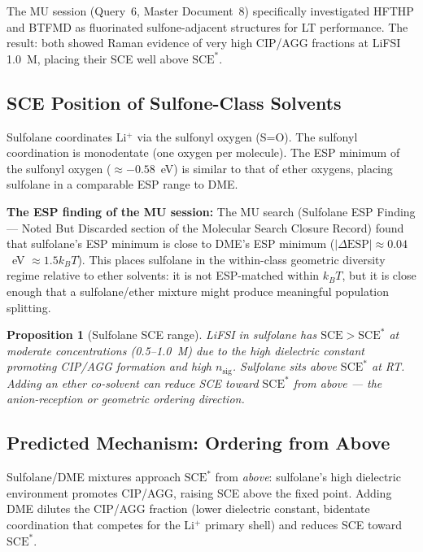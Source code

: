 \documentclass[11pt]{article}
\theoremstyle{plain}
\newtheorem{proposition}[theorem]{Proposition}
\theoremstyle{definition}
\theoremstyle{remark}
\begin{document}
The MU session (Query~6, Master Document~8) specifically
investigated HFTHP and BTFMD as fluorinated sulfone-adjacent
structures for LT performance.  The result: both showed Raman
evidence of very high CIP/AGG fractions at LiFSI 1.0~M, placing
their SCE well above $\mathrm{SCE}^{*}$.

\subsection{SCE Position of Sulfone-Class Solvents}

Sulfolane coordinates Li$^+$ via the sulfonyl oxygen (S=O).
The sulfonyl coordination is monodentate (one oxygen per
molecule).  The ESP minimum of the sulfonyl oxygen
($\approx -0.58$~eV) is similar to that of ether oxygens,
placing sulfolane in a comparable ESP range to DME.

\textbf{The ESP finding of the MU session:} The MU search
(Sulfolane ESP Finding --- Noted But Discarded section of the
Molecular Search Closure Record) found that sulfolane's ESP
minimum is close to DME's ESP minimum ($|\Delta\mathrm{ESP}|
\approx 0.04$~eV $\approx 1.5 k_BT$).  This places sulfolane
in the within-class geometric diversity regime relative to ether
solvents: it is not ESP-matched within $k_BT$, but it is close
enough that a sulfolane/ether mixture might produce meaningful
population splitting.

\begin{proposition}[Sulfolane SCE range]
LiFSI in sulfolane has $\mathrm{SCE} > \mathrm{SCE}^{*}$
at moderate concentrations (0.5--1.0~M) due to the high
dielectric constant promoting CIP/AGG formation and high
$n_\mathrm{sig}$.  Sulfolane sits above $\mathrm{SCE}^{*}$
at RT.  Adding an ether co-solvent can reduce SCE toward
$\mathrm{SCE}^{*}$ from above --- the anion-reception or
geometric ordering direction.
\end{proposition}

\subsection{Predicted Mechanism: Ordering from Above}

Sulfolane/DME mixtures approach $\mathrm{SCE}^{*}$ from
\emph{above}: sulfolane's high dielectric environment promotes
CIP/AGG, raising SCE above the fixed point.  Adding DME
dilutes the CIP/AGG fraction (lower dielectric constant,
bidentate coordination that competes for the Li$^+$ primary
shell) and reduces SCE toward $\mathrm{SCE}^{*}$.
\end{document}
